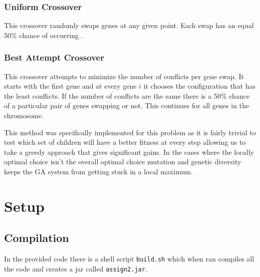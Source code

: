 \documentclass[conference]{IEEEtran}
\begin{document}
\subsubsection{Uniform Crossover} This crossover randomly swaps genes at any given point. Each swap has an equal 50\% chance of occurring \cite[p. 21-29]{ga-tut1}.
\begin{center}

\end{center}

\subsubsection{Best Attempt Crossover}
This crossover attempts to minimize the number of conflicts per gene swap. It starts with the first gene and at every gene $i$ it chooses the configuration that has the least conflicts. If the number of conflicts are the same there is a 50\% chance of a particular pair of genes swapping or not. This continues for all genes in the chromosome. 

\begin{center}

\end{center}

This method was specifically implemented for this problem as it is fairly trivial to test which set of children will have a better fitness at every step allowing us to take a greedy approach that gives significant gains. In the cases where the locally optimal choice isn't the overall optimal choice mutation and genetic diversity keeps the GA system from getting stuck in a local maximum. 

\section{Setup}
\subsection{Compilation}
In the provided code there is a shell script \texttt{build.sh} which when ran compiles all the code and creates a jar called \texttt{assign2.jar}. 
\end{document}

